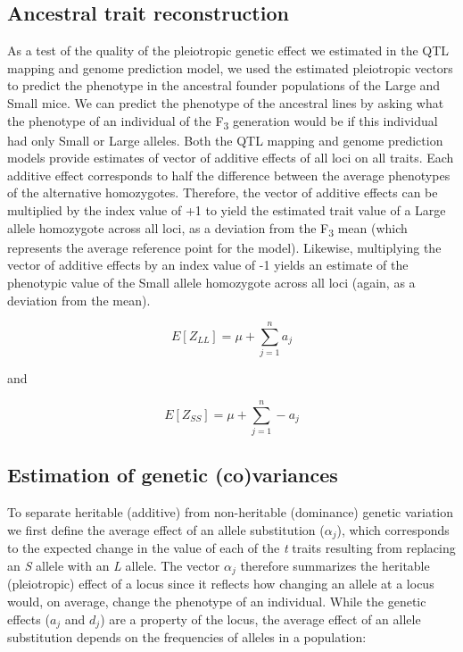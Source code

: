 \begin{refsection}
\subsection{Ancestral trait reconstruction}

As a test of the quality of the pleiotropic genetic effect we estimated
in the QTL mapping and genome prediction model, we used the estimated
pleiotropic vectors to predict the phenotype in the ancestral founder
populations of the Large and Small mice. We can predict the phenotype of
the ancestral lines by asking what the phenotype of an individual of the
F\textsubscript{3} generation would be if this individual had only Small
or Large alleles. Both the QTL mapping and genome prediction models
provide estimates of vector of additive effects of all loci on all
traits. Each additive effect corresponds to half the difference between
the average phenotypes of the alternative homozygotes. Therefore, the
vector of additive effects can be multiplied by the index value of {+1} to
yield the estimated trait value of a Large allele homozygote across all
loci, as a deviation from the F\textsubscript{3} mean (which represents
the average reference point for the model). Likewise, multiplying the
vector of additive effects by an index value of {-1} yields an estimate of
the phenotypic value of the Small allele homozygote across all loci
(again, as a deviation from the mean).

\begin{equation}
E\left\lbrack Z_{LL} \right\rbrack = \mu + \sum_{j=1}^n a_{j}
\end{equation}

and

\begin{equation}
E\left\lbrack Z_{SS} \right\rbrack = \mu + \sum_{j=1}^n -a_{j}
\end{equation}

\subsection{Estimation of genetic (co)variances}

To separate heritable (additive) from non-heritable (dominance) genetic
variation we first define the average effect of an allele substitution
(\(\alpha_{j}\)), which corresponds to the expected change in the value
of each of the \emph{t} traits resulting from replacing an \emph{S}
allele with an \emph{L} allele. The vector \(\alpha_{j}\) therefore
summarizes the heritable (pleiotropic) effect of a locus since it
reflects how changing an allele at a locus would, on average, change the
phenotype of an individual. While the genetic effects (\(a_{j}\) and
\(d_{j}\)) are a property of the locus, the average effect of an allele
substitution depends on the frequencies of alleles in a population:


\end{refsection}
